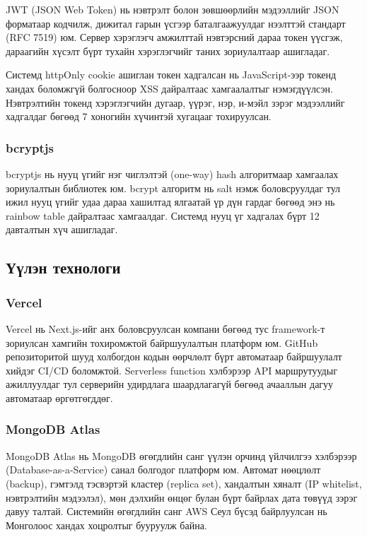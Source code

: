 JWT (JSON Web Token) нь нэвтрэлт болон зөвшөөрлийн мэдээллийг JSON
форматаар кодчилж, дижитал гарын үсгээр баталгаажуулдаг нээлттэй
стандарт (RFC 7519) юм. Сервер хэрэглэгч амжилттай нэвтэрсний дараа
токен үүсгэж, дараагийн хүсэлт бүрт тухайн хэрэглэгчийг таних зориулалтаар
ашигладаг.

Системд httpOnly cookie ашиглан токен хадгалсан нь JavaScript-ээр
токенд хандах боломжгүй болгосноор XSS дайралтаас хамгаалалтыг
нэмэгдүүлсэн. Нэвтрэлтийн токенд хэрэглэгчийн дугаар, үүрэг, нэр,
и-мэйл зэрэг мэдээллийг хадгалдаг бөгөөд 7 хоногийн хүчинтэй хугацааг
тохируулсан.

\subsubsection{bcryptjs}

bcryptjs нь нууц үгийг нэг чиглэлтэй (one-way) hash алгоритмаар
хамгаалах зориулалтын библиотек юм. bcrypt алгоритм нь salt нэмж
боловсруулдаг тул ижил нууц үгийг удаа дараа хашилтад ялгаатай үр дүн
гардаг бөгөөд энэ нь rainbow table дайралтаас хамгаалдаг. Системд
нууц үг хадгалах бүрт 12 давталтын хүч ашигладаг.

\subsection{Үүлэн технологи}

\subsubsection{Vercel}

Vercel нь Next.js-ийг анх боловсруулсан компани бөгөөд тус framework-т
зориулсан хамгийн тохиромжтой байршуулалтын платформ юм. GitHub
репозиторитой шууд холбогдон кодын өөрчлөлт бүрт автоматаар байршуулалт
хийдэг CI/CD боломжтой. Serverless function хэлбэрээр API маршрутуудыг
ажиллуулдаг тул серверийн удирдлага шаардлагагүй бөгөөд ачааллын
дагуу автоматаар өргөтгөгддөг.

\subsubsection{MongoDB Atlas}

MongoDB Atlas нь MongoDB өгөгдлийн санг үүлэн орчинд үйлчилгээ хэлбэрээр
(Database-as-a-Service) санал болгодог платформ юм. Автомат нөөцлөлт
(backup), гэмтэлд тэсвэртэй кластер (replica set), хандалтын хяналт
(IP whitelist, нэвтрэлтийн мэдээлэл), мөн дэлхийн өнцөг булан бүрт байрлах
дата төвүүд зэрэг давуу талтай. Системийн өгөгдлийн санг AWS
Сеул бүсэд байрлуулсан нь Монголоос хандах хоцролтыг бууруулж байна.

